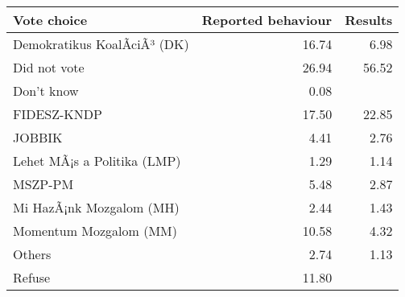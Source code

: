 
\begin{tabular}{l|r|r}
\hline
Vote choice & Reported behaviour & Results\\
\hline
Demokratikus KoalÃ­ciÃ³ (DK) & 16.74 & 6.98\\
\hline
Did not vote & 26.94 & 56.52\\
\hline
Don't know & 0.08 & \\
\hline
FIDESZ-KNDP & 17.50 & 22.85\\
\hline
JOBBIK & 4.41 & 2.76\\
\hline
Lehet MÃ¡s a Politika (LMP) & 1.29 & 1.14\\
\hline
MSZP-PM & 5.48 & 2.87\\
\hline
Mi HazÃ¡nk Mozgalom (MH) & 2.44 & 1.43\\
\hline
Momentum Mozgalom (MM) & 10.58 & 4.32\\
\hline
Others & 2.74 & 1.13\\
\hline
Refuse & 11.80 & \\
\hline
\end{tabular}
